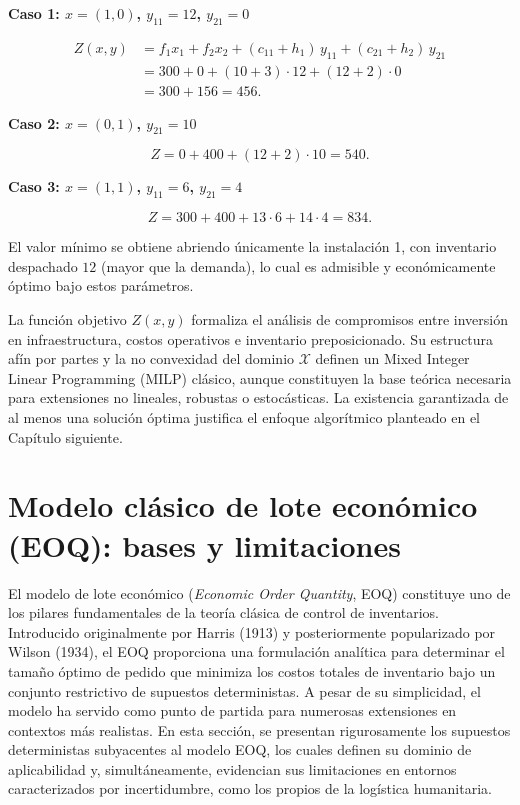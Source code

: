 \documentclass[
  spanish,
  us-letterpaper,
]{scrreprt}
\numberwithin{equation}{section}
\begin{document}
\textbf{Caso 1: \(x = (1, 0)\), \(y_{11} = 12\), \(y_{21} = 0\)}

\[
\begin{aligned}
Z(x,y)
&= f_1 x_1 + f_2 x_2 + (c_{11}+h_1)\,y_{11} + (c_{21}+h_2)\,y_{21} \\
&= 300 + 0 + (10+3)\cdot 12 + (12+2)\cdot 0 \\
&= 300 + 156 = 456.
\end{aligned}
\]

\textbf{Caso 2: \(x = (0,1)\), \(y_{21} = 10\)}

\[
Z = 0 + 400 + (12+2)\cdot 10 = 540.
\]

\textbf{Caso 3: \(x = (1,1)\), \(y_{11} = 6\), \(y_{21} = 4\)}

\[
Z = 300 + 400 + 13\cdot 6 + 14\cdot 4 = 834.
\]

El valor mínimo se obtiene abriendo únicamente la instalación 1, con
inventario despachado \(12\) (mayor que la demanda), lo cual es
admisible y económicamente óptimo bajo estos parámetros.

La función objetivo \(Z(x, y)\) formaliza el análisis de compromisos
entre inversión en infraestructura, costos operativos e inventario
preposicionado. Su estructura afín por partes y la no convexidad del
dominio \(\mathcal{X}\) definen un Mixed Integer Linear Programming
(MILP) clásico, aunque constituyen la base teórica necesaria para
extensiones no lineales, robustas o estocásticas. La existencia
garantizada de al menos una solución óptima justifica el enfoque
algorítmico planteado en el Capítulo siguiente.

\section{Modelo clásico de lote económico (EOQ): bases y
limitaciones}\label{modelo-cluxe1sico-de-lote-econuxf3mico-eoq-bases-y-limitaciones}

El modelo de lote económico (\emph{Economic Order Quantity}, EOQ)
constituye uno de los pilares fundamentales de la teoría clásica de
control de inventarios. Introducido originalmente por Harris (1913) y
posteriormente popularizado por Wilson (1934), el EOQ proporciona una
formulación analítica para determinar el tamaño óptimo de pedido que
minimiza los costos totales de inventario bajo un conjunto restrictivo
de supuestos deterministas. A pesar de su simplicidad, el modelo ha
servido como punto de partida para numerosas extensiones en contextos
más realistas. En esta sección, se presentan rigurosamente los supuestos
deterministas subyacentes al modelo EOQ, los cuales definen su dominio
de aplicabilidad y, simultáneamente, evidencian sus limitaciones en
entornos caracterizados por incertidumbre, como los propios de la
logística humanitaria.
\end{document}
